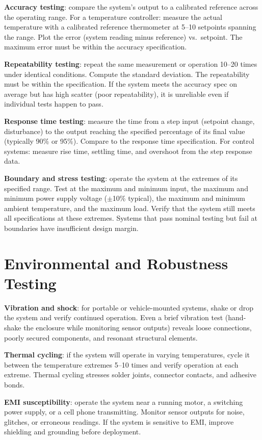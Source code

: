 \documentclass[11pt,letterpaper,twoside,openany]{book}
\begin{document}
\textbf{Accuracy testing}: compare the system's output to a calibrated reference across the operating range. For a temperature controller: measure the actual temperature with a calibrated reference thermometer at 5--10 setpoints spanning the range. Plot the error (system reading minus reference) vs.\ setpoint. The maximum error must be within the accuracy specification.

\textbf{Repeatability testing}: repeat the same measurement or operation 10--20 times under identical conditions. Compute the standard deviation. The repeatability must be within the specification. If the system meets the accuracy spec on average but has high scatter (poor repeatability), it is unreliable even if individual tests happen to pass.

\textbf{Response time testing}: measure the time from a step input (setpoint change, disturbance) to the output reaching the specified percentage of its final value (typically 90\% or 95\%). Compare to the response time specification. For control systems: measure rise time, settling time, and overshoot from the step response data.

\textbf{Boundary and stress testing}: operate the system at the extremes of its specified range. Test at the maximum and minimum input, the maximum and minimum power supply voltage ($\pm$10\% typical), the maximum and minimum ambient temperature, and the maximum load. Verify that the system still meets all specifications at these extremes. Systems that pass nominal testing but fail at boundaries have insufficient design margin.

\section{Environmental and Robustness Testing}
\textbf{Vibration and shock}: for portable or vehicle-mounted systems, shake or drop the system and verify continued operation. Even a brief vibration test (hand-shake the enclosure while monitoring sensor outputs) reveals loose connections, poorly secured components, and resonant structural elements.

\textbf{Thermal cycling}: if the system will operate in varying temperatures, cycle it between the temperature extremes 5--10 times and verify operation at each extreme. Thermal cycling stresses solder joints, connector contacts, and adhesive bonds.

\textbf{EMI susceptibility}: operate the system near a running motor, a switching power supply, or a cell phone transmitting. Monitor sensor outputs for noise, glitches, or erroneous readings. If the system is sensitive to EMI, improve shielding and grounding before deployment.
\end{document}
